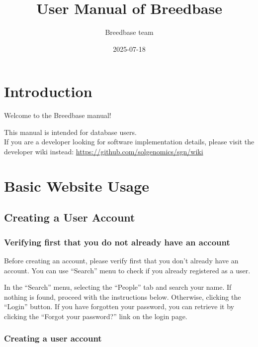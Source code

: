 \documentclass[
  12pt,
]{book}
\title{User Manual of Breedbase}
\author{Breedbase team}
\date{2025-07-18}
\begin{document}
\maketitle

{
\hypersetup{linkcolor=}
\setcounter{tocdepth}{2}
\tableofcontents
}
\hypertarget{introduction}{%
\chapter*{Introduction}\label{introduction}}


Welcome to the Breedbase manual!

This manual is intended for database users.\\
If you are a developer looking for software implementation details, please visit the developer wiki instead: \url{https://github.com/solgenomics/sgn/wiki}

\hypertarget{basic-website-usage}{%
\chapter{Basic Website Usage}\label{basic-website-usage}}

\hypertarget{creating-a-user-account}{%
\section{Creating a User Account}\label{creating-a-user-account}}

\hypertarget{verifying-first-that-you-do-not-already-have-an-account}{%
\subsection{Verifying first that you do not already have an account}\label{verifying-first-that-you-do-not-already-have-an-account}}

Before creating an account, please verify first that you don't already have an account. You can use ``Search'' menu to check if you already registered as a user.

In the ``Search'' menu, selecting the ``People'' tab and search your name. If nothing is found, proceed with the instructions below. Otherwise, clicking the ``Login'' button. If you have forgotten your password, you can retrieve it by clicking the ``Forgot your password?'' link on the login page.

\hypertarget{creating-a-user-account-1}{%
\subsection{Creating a user account}\label{creating-a-user-account-1}}
\end{document}
